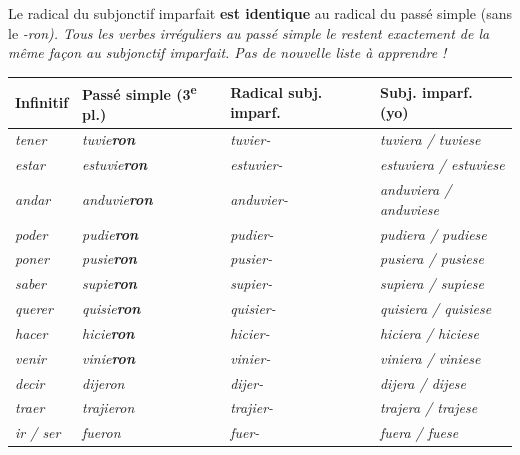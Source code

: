 \documentclass[11pt]{article}
\newcommand{\esp}[1]{\ifmmode\text{\textit{#1}}\else\begingroup\selectlanguage{spanish}\itshape #1\endgroup\fi}
\begin{document}
\begin{aretenir}
Le radical du subjonctif imparfait \textbf{est identique} au radical du passé simple (sans le \esp{-ron}). Tous les verbes irréguliers au passé simple le restent \emph{exactement de la même façon} au subjonctif imparfait. Pas de nouvelle liste à apprendre !

\begin{center}
\begin{tabularx}{\linewidth}{|X|X|X|X|}\hline
\rowcolor{popblueL} Infinitif & Passé simple (3\textsuperscript{e} pl.) & Radical subj. imparf. & Subj. imparf. (yo) \\ \hline
\esp{tener} & \esp{tuvie\textbf{ron}} & \esp{tuvier-} & \esp{tuviera / tuviese} \\ \hline
\esp{estar} & \esp{estuvie\textbf{ron}} & \esp{estuvier-} & \esp{estuviera / estuviese} \\ \hline
\esp{andar} & \esp{anduvie\textbf{ron}} & \esp{anduvier-} & \esp{anduviera / anduviese} \\ \hline
\esp{poder} & \esp{pudie\textbf{ron}} & \esp{pudier-} & \esp{pudiera / pudiese} \\ \hline
\esp{poner} & \esp{pusie\textbf{ron}} & \esp{pusier-} & \esp{pusiera / pusiese} \\ \hline
\esp{saber} & \esp{supie\textbf{ron}} & \esp{supier-} & \esp{supiera / supiese} \\ \hline
\esp{querer} & \esp{quisie\textbf{ron}} & \esp{quisier-} & \esp{quisiera / quisiese} \\ \hline
\esp{hacer} & \esp{hicie\textbf{ron}} & \esp{hicier-} & \esp{hiciera / hiciese} \\ \hline
\esp{venir} & \esp{vinie\textbf{ron}} & \esp{vinier-} & \esp{viniera / viniese} \\ \hline
\esp{decir} & \esp{dijeron} & \esp{dijer-} & \esp{dijera / dijese} \\ \hline
\esp{traer} & \esp{trajieron} & \esp{trajier-} & \esp{trajera / trajese} \\ \hline
\esp{ir / ser} & \esp{fueron} & \esp{fuer-} & \esp{fuera / fuese} \\ \hline
\end{tabularx}
\end{center}
\end{aretenir}
\end{document}
